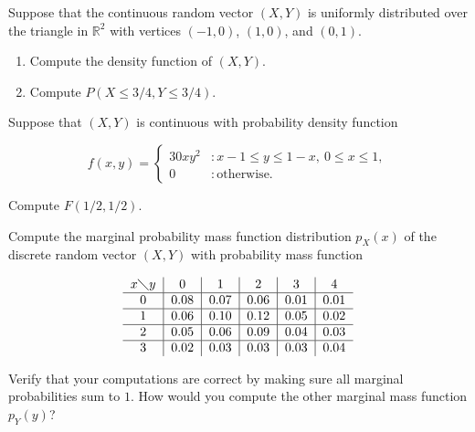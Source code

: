 \documentclass[12pt,reqno]{amsart}
\begin{document}
\prob Suppose that the continuous random vector $(X,Y)$ is uniformly distributed over the triangle in $\mathbb{R}^2$ with vertices $(-1,0)$, $(1,0)$, and $(0,1)$.

\medskip
\begin{enumerate}
\item Compute the density function of $(X,Y)$.\vfill
\item Compute $P(X \leq 3/4, Y \leq 3/4)$.\vfill
\end{enumerate}

















\bigskip
\prob Suppose that $(X,Y)$ is continuous with probability density function

	\[
	f(x,y) = \begin{cases}
	30xy^2 & : x-1 \leq y \leq 1-x, \ 0 \leq x \leq 1, \\
	0 & : \text{otherwise}.
	\end{cases}
	\]

Compute $F(1/2,1/2)$.\vfill















\newpage
\prob Compute the marginal probability mass function distribution $p_X(x)$ of the discrete random vector $(X,Y)$ with probability mass function


	\[
	\begin{tabular}{c|c|c|c|c|c}
	$x \diagdown y$ & 0 & 1 & 2 & 3 & 4  \\ \hline
	0 & 0.08 & 0.07 & 0.06 & 0.01 & 0.01 \\ \hline
	1 & 0.06 & 0.10 & 0.12 & 0.05 & 0.02 \\ \hline
	2 & 0.05 & 0.06 & 0.09 & 0.04 & 0.03 \\ \hline
	3 & 0.02 & 0.03 & 0.03 & 0.03 & 0.04 
	\end{tabular}
	\]

\medskip
Verify that your computations are correct by making sure all marginal probabilities sum to $1$. How would you compute the other marginal mass function $p_Y(y)$?\vfill
\end{document}
